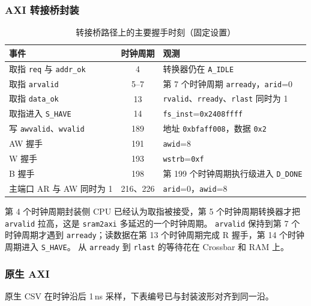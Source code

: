 \documentclass{article}
\begin{document}
\subsubsection{AXI 转接桥封装}
\begin{table}[H]
\centering
\small
\caption{转接桥路径上的主要握手时刻（固定设置）}
\begin{tabular}{@{}p{}cp{}@{}}
\toprule
事件 & 时钟周期 & 观测 \\
\midrule
取指 \texttt{req} 与 \texttt{addr\_ok} & 4 & 转换器仍在 \texttt{A\_IDLE} \\
取指 \texttt{arvalid} & 5--7 & 第 7 个时钟周期 \texttt{arready}，\texttt{arid}=0 \\
取指 \texttt{data\_ok} & 13 & \texttt{rvalid}、\texttt{rready}、\texttt{rlast} 同时为 1 \\
取指进入 \texttt{S\_HAVE} & 14 & \texttt{fs\_inst}=\texttt{0x2408ffff} \\
写 \texttt{awvalid}、\texttt{wvalid} & 189 & 地址 \texttt{0xbfaff008}，数据 \texttt{0x2} \\
AW 握手 & 191 & \texttt{awid}=8 \\
W 握手 & 193 & \texttt{wstrb}=\texttt{0xf} \\
B 握手 & 198 & 第 199 个时钟周期执行级进入 \texttt{D\_DONE} \\
主端口 AR 与 AW 同时为 1 & 216、226 & \texttt{arid}=0，\texttt{awid}=8 \\
\bottomrule
\end{tabular}
\end{table}

第 4 个时钟周期封装侧 CPU 已经认为取指被接受，第 5 个时钟周期转换器才把 \texttt{arvalid} 拉高，这是 \texttt{sram2axi} 多延迟的一个时钟周期。
\texttt{arvalid} 保持到第 7 个时钟周期才遇到 \texttt{arready}；读数据在第 13 个时钟周期完成 R 握手，第 14 个时钟周期进入 \texttt{S\_HAVE}。
从 \texttt{arready} 到 \texttt{rlast} 的等待花在 Crossbar 和 RAM 上。

\subsubsection{原生 AXI}
原生 CSV 在时钟沿后 1\,ns 采样，下表编号已与封装波形对齐到同一沿。
\end{document}

